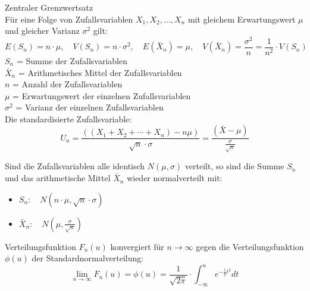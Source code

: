 \begin{theorem}{Zentraler Grenzwertsatz}\\
Für eine Folge von Zufallsvariablen $X_1, X_2, \ldots, X_n$ mit gleichem Erwartungswert $\mu$ und gleicher Varianz $\sigma^2$ gilt:
$$
E(S_n)=n \cdot \mu, \quad V(S_n)=n \cdot \sigma^2, \quad E(\bar{X}_n)=\mu, \quad V(\bar{X}_n)=\frac{\sigma^2}{n}=\frac{1}{n^2} \cdot V(S_n)
$$
$S_n$ = Summe der Zufallsvariablen\\
$\bar{X}_n$ = Arithmetisches Mittel der Zufallsvariablen\\
$n$ = Anzahl der Zufallsvariablen\\
$\mu$ = Erwartungswert der einzelnen Zufallsvariablen\\
$\sigma^2$ = Varianz der einzelnen Zufallsvariablen\\

Die standardisierte Zufallsvariable:
$$
U_n=\frac{((X_1+X_2+\cdots+X_n)-n\mu)}{\sqrt{n} \cdot \sigma}=\frac{(\bar{X}-\mu)}{\frac{\sigma}{\sqrt{n}}}
$$

Sind die Zufallsvariablen alle identisch $N(\mu,\sigma)$ verteilt, so sind die Summe $S_n$ und das arithmetische Mittel $\bar{X}_n$ wieder normalverteilt mit:
\begin{itemize}
  \item $S_n: \quad N(n \cdot \mu, \sqrt{n} \cdot \sigma)$
  \item $\bar{X}_n: \quad N(\mu, \frac{\sigma}{\sqrt{n}})$
\end{itemize}

Verteilungsfunktion $F_n(u)$ konvergiert für $n \to \infty$ gegen die Verteilungsfunktion $\phi(u)$ der Standardnormalverteilung:
$$
\lim_{n\to\infty} F_n(u) = \phi(u) = \frac{1}{\sqrt{2\pi}} \cdot \int_{-\infty}^u e^{-\frac{1}{2}t^2} dt
$$
\end{theorem}

